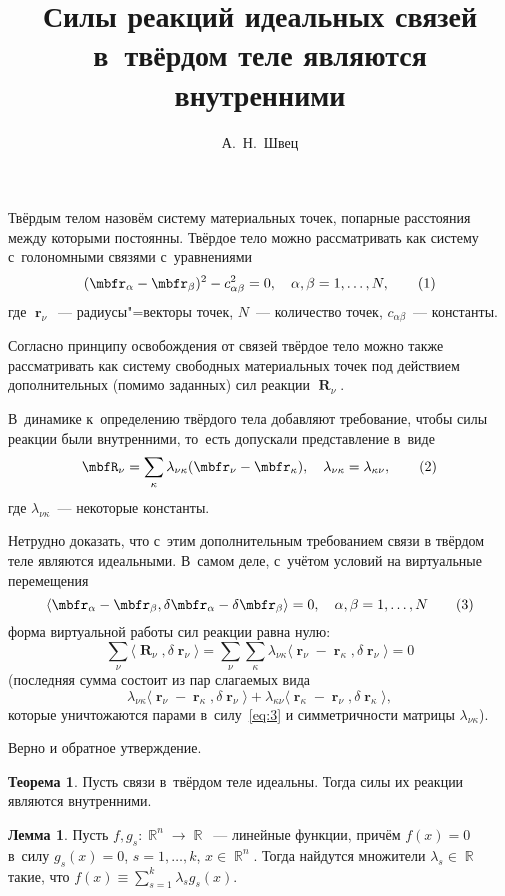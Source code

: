 \documentclass[a4paper,11pt,draft]{article}
\title{Силы реакций идеальных связей в~твёрдом теле являются внутренними}
\author{А.~Н.~Швец}
\newcommand\eqtag[1]{\refstepcounter{equation}\tag{\theequation}\label{#1}}
\theoremstyle{definition}
\newtheorem*{theorem*}{Теорема}
\newtheorem*{lem*}{Лемма}
\begin{document}
\maketitle

Твёрдым телом назовём систему материальных точек, попарные расстояния между
которыми постоянны. Твёрдое тело можно рассматривать как систему с~голономными
связями с~уравнениями
	\[
	(\mbfr_\alpha-\mbfr_\beta)^2-c_{\alpha\beta}^2=0,
	\quad
	\alpha,\beta=1,\ldots,N,
	\eqtag{eq:1}
	\]
где $\mbfr_\nu$~— радиусы"=векторы точек, $N$~— количество точек,
$c_{\alpha\beta}$~— константы.

Согласно принципу освобождения от связей твёрдое тело можно также рассматривать
как систему свободных материальных точек под действием дополнительных (помимо
заданных) сил реакции $\mbfR_\nu$.

В~динамике к~определению твёрдого тела добавляют требование, чтобы силы реакции
были внутренними, то~есть допускали представление в~виде
	\[
	\mbfR_\nu=\sum_\kappa\lambda_{\nu\kappa}(\mbfr_\nu-\mbfr_\kappa),
	\quad
	\lambda_{\nu\kappa}=\lambda_{\kappa\nu},
	\eqtag{eq:2}
	\]
где $\lambda_{\nu\kappa}$~— некоторые константы.

Нетрудно доказать, что с~этим дополнительным требованием связи в твёрдом теле
являются идеальными. В~самом деле, с~учётом условий на виртуальные перемещения
	\[
	\langle\mbfr_\alpha-\mbfr_\beta,\delta\mbfr_\alpha-\delta\mbfr_\beta\rangle=0,
	\quad
	\alpha,\beta=1,\ldots,N
	\eqtag{eq:3}
	\]
форма виртуальной работы сил реакции равна нулю:
	\[
	\sum_\nu\langle\mbfR_\nu,\delta\mbfr_\nu\rangle
		=\sum_\nu\sum_\kappa\lambda_{\nu\kappa}
		\langle\mbfr_\nu-\mbfr_\kappa,\delta\mbfr_\nu\rangle=0
	\]
(последняя сумма состоит из пар слагаемых вида
	\[
	\lambda_{\nu\kappa}\langle\mbfr_\nu-\mbfr_\kappa,\delta\mbfr_\nu\rangle
		+\lambda_{\kappa\nu}\langle\mbfr_\kappa-\mbfr_\nu,\delta\mbfr_\kappa\rangle,
	\]
которые уничтожаются парами в~силу~\eqref{eq:3} и симметричности матрицы
$\lambda_{\nu\kappa}$).

Верно и обратное утверждение.

\begin{theorem*}
Пусть связи в~твёрдом теле идеальны. Тогда силы их реакции являются
внутренними.
\end{theorem*}

\begin{lem*}
Пусть $f,g_s\colon\BbbR^n\to\BbbR$~— линейные функции, причём $f(x)=0$ в~силу
$g_s(x)=0$, $s=1,\ldots,k$, $x\in\BbbR^n$. Тогда найдутся множители
$\lambda_s\in\BbbR$ такие, что $f(x)\equiv\sum_{s=1}^k\lambda_s g_s(x)$.
\end{lem*}
\end{document}
